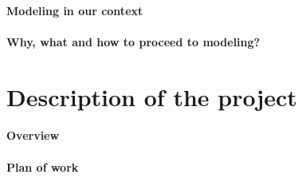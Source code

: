 \documentclass[english]{article}
\begin{document}
\paragraph{Modeling in our context}


\paragraph{Why, what and how to proceed to modeling?}


\section{Description of the project}


\paragraph{Overview}


\paragraph{Plan of work}



\end{document}
